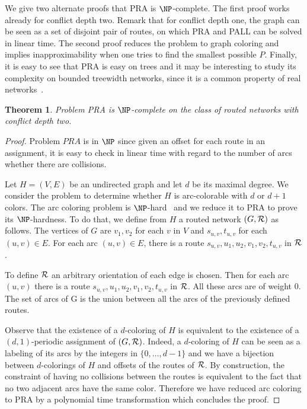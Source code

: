 \documentclass[10pt, conference, letterpaper]{IEEEtran}
\newtheorem{theorem}{Theorem}
\begin{document}
We give two alternate proofs that PRA is $\NP$-complete.
The first proof works already for conflict depth two. Remark that for conflict depth one,
the graph can be seen as a set of disjoint pair of routes, on which PRA and PALL can be solved in linear time. 
 The second proof reduces the problem to graph coloring and implies inapproximability when one tries to find the smallest possible $P$.  Finally, it is easy to see that PRA is easy on trees and it may be interesting to study its complexity on 
 bounded treewidth networks, since it is a common property of real networks~\cite{de2011treewidth}.
 

 \begin{theorem}
Problem PRA is $\NP$-complete on the class of routed networks with conflict depth two.
\end{theorem}
 \begin{proof}
 Problem $PRA$ is in $\NP$ since given an offset for each route in an assignment, it is easy to check in linear time with regard to the number of arcs whether there are collisions.
 
  Let $H=(V,E)$ be an undirected graph and let $d$ be its maximal degree. We consider the problem to determine whether $H$ is arc-colorable  with $d$ or $d+1$ colors. The arc coloring problem is $\NP$-hard~\cite{holyer1981np} and we reduce it to PRA to prove its $\NP$-hardness. To do that, we define from $H$ a routed network $(G,{\cal R})$ as follows.
  The vertices of $G$ are $v_1, v_2$ for each $v$ in $V$ and $s_{u,v}, t_{u,v}$ for each $(u,v) \in E$.
  For each arc $(u,v) \in E$, there is a route $s_{u,v},u_1,u_2,v_1,v_2,t_{u,v}$ in ${\cal R}$. 
  
   To define ${\cal R}$ an arbitrary orientation of each edge is chosen. 
   Then for each arc $(u,v)$ there is a route $s_{u,v},u_1,u_2,v_1,v_2,t_{u,v}$ in ${\cal R}$.
  All these arcs are of weight $0$. The set of arcs of G is the union between all the arcs of the previously defined routes.
   
  Observe that the existence of a $d$-coloring of $H$ is equivalent to the existence of a $(d,1)$-periodic assignment
  of $(G,{\cal R})$. Indeed, a $d$-coloring of $H$ can be seen as a labeling of its arcs by the integers
  in $\{0,\dots,d-1\}$ and we have a bijection between $d$-colorings of $H$ and offsets of the routes of ${\cal R}$.
  By construction, the constraint of having no collisions between the routes is equivalent to the fact that no two adjacent arcs have the same color. Therefore we have reduced arc coloring to PRA by a polynomial time transformation which concludes the proof. 
 \end{proof}
 
\end{document}
